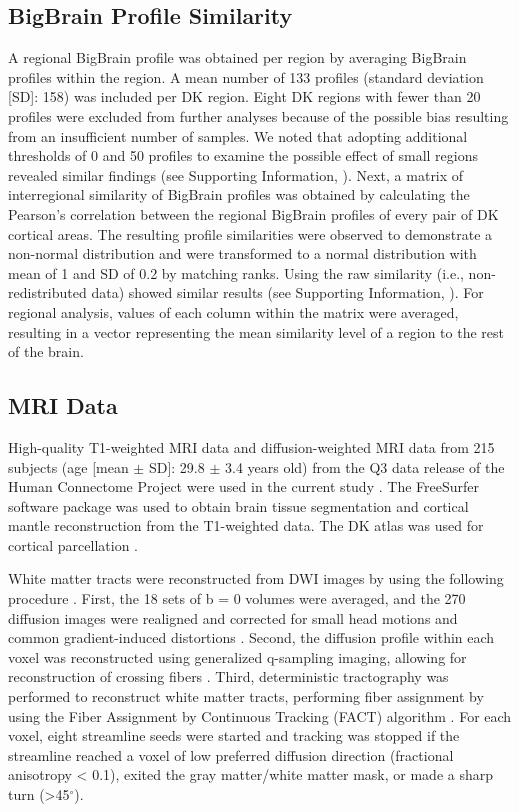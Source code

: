 \begin{refsection}
\subsection*{BigBrain Profile Similarity}
A regional BigBrain profile was obtained per region by averaging BigBrain profiles within the region. A mean number of 133 profiles (standard deviation [SD]: 158) was included per DK region. Eight DK regions with fewer than 20 profiles were excluded from further analyses because of the possible bias resulting from an insufficient number of samples. We noted that adopting additional thresholds of 0 and 50 profiles to examine the possible effect of small regions revealed similar findings (see Supporting Information, \citet{WEI2019bigbrain}). Next, a matrix of interregional similarity of BigBrain profiles was obtained by calculating the Pearson’s correlation between the regional BigBrain profiles of every pair of DK cortical areas. The resulting profile similarities were observed to demonstrate a non-normal distribution and were transformed to a normal distribution with mean of 1 and SD of 0.2 by matching ranks. Using the raw similarity (i.e., non-redistributed data) showed similar results (see Supporting Information, \citet{WEI2019bigbrain}). For regional analysis, values of each column within the matrix were averaged, resulting in a vector representing the mean similarity level of a region to the rest of the brain.

\subsection*{MRI Data}
High-quality T1-weighted MRI data and diffusion-weighted MRI data from 215 subjects (age [mean $\pm$ SD]: 29.8 $\pm$ 3.4 years old) from the Q3 data release of the Human Connectome Project were used in the current study \citep{VANESSEN201362}. The FreeSurfer software package \citep{FISCHL2012Freesurfer} was used to obtain brain tissue segmentation and cortical mantle reconstruction from the T1-weighted data. The DK atlas was used for cortical parcellation \citep{DESIKAN2006968,Fischl2004parcellation}.

White matter tracts were reconstructed from DWI images by using the following procedure \citep{VANDENHEUVEL2016293}. First, the 18 sets of b = 0 volumes were averaged, and the 270 diffusion images were realigned and corrected for small head motions and common gradient-induced distortions \citep{ANDERSSON2002177}. Second, the diffusion profile within each voxel was reconstructed using generalized q-sampling imaging, allowing for reconstruction of crossing fibers \citep{YEH2010}. Third, deterministic tractography was performed to reconstruct white matter tracts, performing fiber assignment by using the Fiber Assignment by Continuous Tracking (FACT) algorithm \citep{MORI1999}. For each voxel, eight streamline seeds were started and tracking was stopped if the streamline reached a voxel of low preferred diffusion direction (fractional anisotropy < 0.1), exited the gray matter/white matter mask, or made a sharp turn (>45$^{\circ}$).


\end{refsection}
